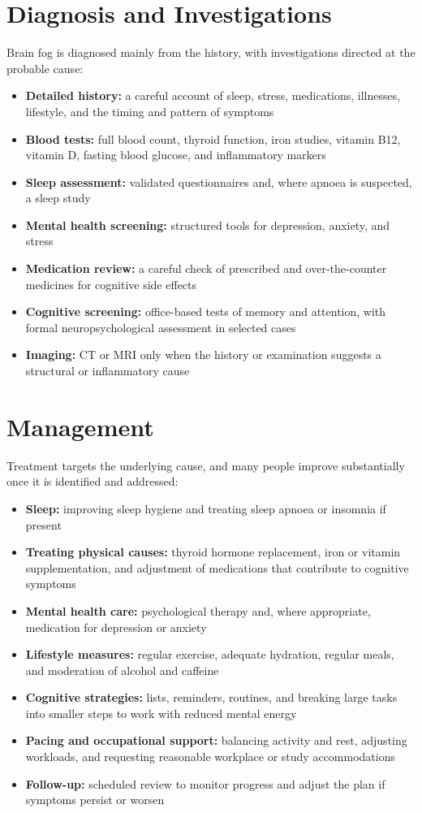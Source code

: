 \section*{Diagnosis and Investigations}
Brain fog is diagnosed mainly from the history, with investigations directed at the probable cause:

\begin{itemize}
    \item \textbf{Detailed history:} a careful account of sleep, stress, medications, illnesses, lifestyle, and the timing and pattern of symptoms
    \item \textbf{Blood tests:} full blood count, thyroid function, iron studies, vitamin B12, vitamin D, fasting blood glucose, and inflammatory markers
    \item \textbf{Sleep assessment:} validated questionnaires and, where apnoea is suspected, a sleep study
    \item \textbf{Mental health screening:} structured tools for depression, anxiety, and stress
    \item \textbf{Medication review:} a careful check of prescribed and over-the-counter medicines for cognitive side effects
    \item \textbf{Cognitive screening:} office-based tests of memory and attention, with formal neuropsychological assessment in selected cases
    \item \textbf{Imaging:} CT or MRI only when the history or examination suggests a structural or inflammatory cause
\end{itemize}

\section*{Management}
Treatment targets the underlying cause, and many people improve substantially once it is identified and addressed:

\begin{itemize}
    \item \textbf{Sleep:} improving sleep hygiene and treating sleep apnoea or insomnia if present
    \item \textbf{Treating physical causes:} thyroid hormone replacement, iron or vitamin supplementation, and adjustment of medications that contribute to cognitive symptoms
    \item \textbf{Mental health care:} psychological therapy and, where appropriate, medication for depression or anxiety
    \item \textbf{Lifestyle measures:} regular exercise, adequate hydration, regular meals, and moderation of alcohol and caffeine
    \item \textbf{Cognitive strategies:} lists, reminders, routines, and breaking large tasks into smaller steps to work with reduced mental energy
    \item \textbf{Pacing and occupational support:} balancing activity and rest, adjusting workloads, and requesting reasonable workplace or study accommodations
    \item \textbf{Follow-up:} scheduled review to monitor progress and adjust the plan if symptoms persist or worsen
\end{itemize}

